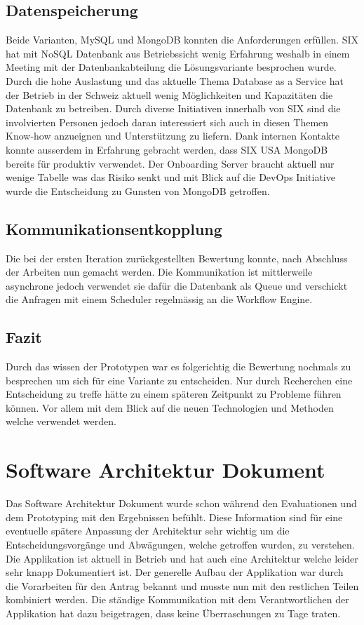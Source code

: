 \subsection{Datenspeicherung}

Beide Varianten, MySQL und MongoDB konnten die Anforderungen erfüllen. SIX hat mit NoSQL Datenbank aus Betriebssicht wenig Erfahrung weshalb in einem Meeting mit der Datenbankabteilung die Lösungsvariante besprochen wurde. Durch die hohe Auslastung und das aktuelle Thema Database as a Service hat der Betrieb in der Schweiz aktuell wenig Möglichkeiten und Kapazitäten die Datenbank zu betreiben. Durch diverse Initiativen innerhalb von SIX sind die involvierten Personen jedoch daran interessiert sich auch in diesen Themen Know-how anzueignen und Unterstützung zu liefern. Dank internen Kontakte konnte ausserdem in Erfahrung gebracht werden, dass SIX USA MongoDB bereits für produktiv verwendet. Der Onboarding Server braucht aktuell nur wenige Tabelle was das Risiko senkt und mit Blick auf die DevOps Initiative wurde die Entscheidung zu Gunsten von MongoDB getroffen.

\subsection{Kommunikationsentkopplung}

Die bei der ersten Iteration zurückgestellten Bewertung konnte, nach Abschluss der Arbeiten nun gemacht werden. Die Kommunikation ist mittlerweile asynchrone jedoch verwendet sie dafür die Datenbank als Queue und verschickt die Anfragen mit einem Scheduler regelmässig an die Workflow Engine.

\subsection{Fazit}

Durch das wissen der Prototypen war es folgerichtig die Bewertung nochmals zu besprechen um sich für eine Variante zu entscheiden. Nur durch Recherchen eine Entscheidung zu treffe hätte zu einem späteren Zeitpunkt zu Probleme führen können. Vor allem mit dem Blick auf die neuen Technologien und Methoden welche verwendet werden.

\section{Software Architektur Dokument}

Das Software Architektur Dokument wurde schon während den Evaluationen und dem Prototyping mit den Ergebnissen befühlt. Diese Information sind für eine eventuelle spätere Anpassung der Architektur sehr wichtig um die Entscheidungsvorgänge und Abwägungen, welche getroffen wurden, zu verstehen. Die Applikation ist aktuell in Betrieb und hat auch eine Architektur welche leider sehr knapp Dokumentiert ist. Der generelle Aufbau der Applikation war durch die Vorarbeiten für den Antrag bekannt und musste nun mit den restlichen Teilen kombiniert werden. Die ständige Kommunikation mit dem Verantwortlichen der Applikation hat dazu beigetragen, dass keine Überraschungen zu Tage traten.

